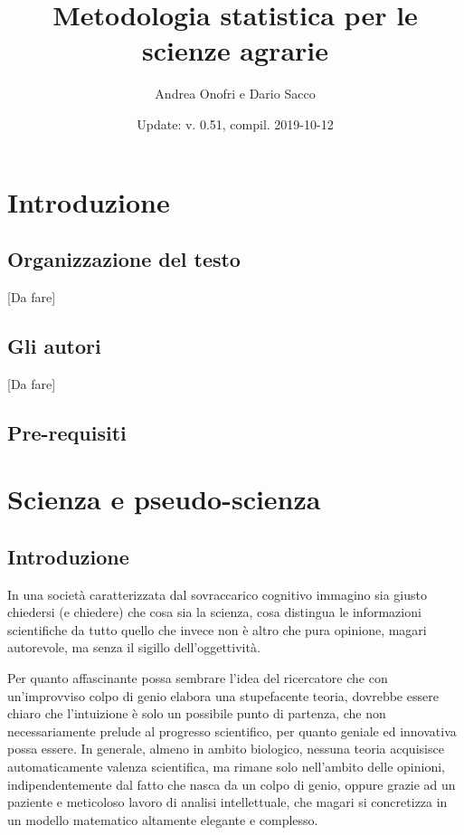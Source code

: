 \documentclass[a4paper,12pt,oneside]{book}
\author{Andrea Onofri e Dario Sacco}
\date{Update: v. 0.51, compil. 2019-10-12}
\title{Metodologia statistica per le scienze agrarie}
\subtitle{}
\theoremstyle{definition}
\theoremstyle{definition}
\theoremstyle{definition}
\theoremstyle{remark}
\begin{document}
\maketitle
\tableofcontents

\chapter*{Introduzione}\label{introduzione}

\section*{Organizzazione del testo}\label{organizzazione-del-testo}

{[}Da fare{]}

\section*{Gli autori}\label{gli-autori}

{[}Da fare{]}

\section*{Pre-requisiti}\label{pre-requisiti}

\chapter{Scienza e pseudo-scienza}\label{scienza-e-pseudo-scienza}

\section{Introduzione}\label{introduzione-1}

In una società caratterizzata dal sovraccarico cognitivo immagino sia
giusto chiedersi (e chiedere) che cosa sia la scienza, cosa distingua le
informazioni scientifiche da tutto quello che invece non è altro che
pura opinione, magari autorevole, ma senza il sigillo dell'oggettività.

Per quanto affascinante possa sembrare l'idea del ricercatore che con
un'improvviso colpo di genio elabora una stupefacente teoria, dovrebbe
essere chiaro che l'intuizione è solo un possibile punto di partenza,
che non necessariamente prelude al progresso scientifico, per quanto
geniale ed innovativa possa essere. In generale, almeno in ambito
biologico, nessuna teoria acquisisce automaticamente valenza
scientifica, ma rimane solo nell'ambito delle opinioni,
indipendentemente dal fatto che nasca da un colpo di genio, oppure
grazie ad un paziente e meticoloso lavoro di analisi intellettuale, che
magari si concretizza in un modello matematico altamente elegante e
complesso.
\end{document}
